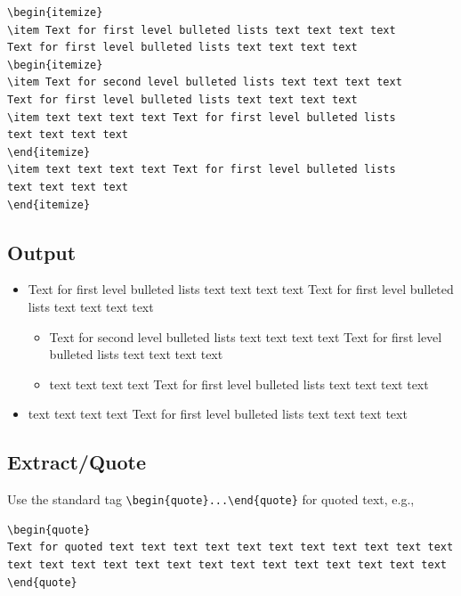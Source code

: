 \documentclass[]{Liebert_Author}
\begin{document}
\begin{verbatim}
\begin{itemize}
\item Text for first level bulleted lists text text text text
Text for first level bulleted lists text text text text 
\begin{itemize}
\item Text for second level bulleted lists text text text text
Text for first level bulleted lists text text text text 
\item text text text text Text for first level bulleted lists
text text text text 
\end{itemize}
\item text text text text Text for first level bulleted lists
text text text text 
\end{itemize}
\end{verbatim}

\subsection*{Output}

\begin{itemize}
\item Text for first level bulleted lists text text text text Text for first level bulleted lists text text text text 
\begin{itemize}
\item Text for second level bulleted lists text text text text Text for first level bulleted lists text text text text 
\item text text text text Text for first level bulleted lists text text text text 
\end{itemize}
\item text text text text Text for first level bulleted lists text text text text 
\end{itemize}

\subsection*{Extract/Quote}

Use the standard tag \verb!\begin{quote}...\end{quote}! for quoted text, e.g.,

\begin{verbatim}
\begin{quote}
Text for quoted text text text text text text text text text text text
text text text text text text text text text text text text text text 
\end{quote}
\end{verbatim}
\end{document}
